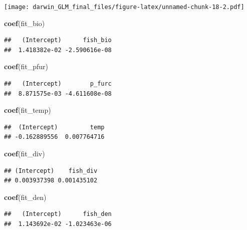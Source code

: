 \documentclass[]{article}
\newenvironment{Shaded}{\begin{snugshade}}{\end{snugshade}}
\newcommand{\KeywordTok}[1]{\textcolor[rgb]{0.13,0.29,0.53}{\textbf{#1}}}
\newcommand{\NormalTok}[1]{#1}
\begin{document}
\texttt{[image: darwin\_GLM\_final\_files/figure-latex/unnamed-chunk-18-2.pdf]}

\begin{Shaded}
\begin{Highlighting}[]
\KeywordTok{coef}\NormalTok{(fit_bio)}
\end{Highlighting}
\end{Shaded}

\begin{verbatim}
##   (Intercept)      fish_bio 
##  1.418382e-02 -2.590616e-08
\end{verbatim}

\begin{Shaded}
\begin{Highlighting}[]
\KeywordTok{coef}\NormalTok{(fit_pfur) }
\end{Highlighting}
\end{Shaded}

\begin{verbatim}
##   (Intercept)        p_furc 
##  8.871575e-03 -4.611608e-08
\end{verbatim}

\begin{Shaded}
\begin{Highlighting}[]
\KeywordTok{coef}\NormalTok{(fit_temp) }
\end{Highlighting}
\end{Shaded}

\begin{verbatim}
##  (Intercept)         temp 
## -0.162889556  0.007764716
\end{verbatim}

\begin{Shaded}
\begin{Highlighting}[]
\KeywordTok{coef}\NormalTok{(fit_div)}
\end{Highlighting}
\end{Shaded}

\begin{verbatim}
## (Intercept)    fish_div 
## 0.003937398 0.001435102
\end{verbatim}

\begin{Shaded}
\begin{Highlighting}[]
\KeywordTok{coef}\NormalTok{(fit_den)}
\end{Highlighting}
\end{Shaded}

\begin{verbatim}
##   (Intercept)      fish_den 
##  1.143692e-02 -1.023463e-06
\end{verbatim}
\end{document}

